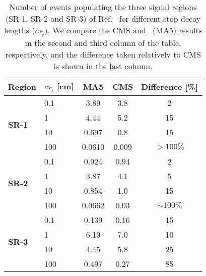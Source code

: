 \begin{table}[t]
\begin{center}
  \begin{tabular}{l || l | c  c | c }
    Region & $c\tau_{\tilde t}$ [cm] & MA5 & CMS& Difference [\%] \\ \hline\hline
    \multirow{4}{*}{\bf SR-1}& 0.1 & 3.89   & 3.8  & 2\\
                             & 1   & 4.44   & 5.2  & 15\\
                             & 10  & 0.697  & 0.8  & 15\\
                             & 100 & 0.0610 & 0.009& $> 100\%$\\ \hline
    \multirow{4}{*}{\bf SR-2}& 0.1 & 0.924  & 0.94 & 2\\
                             & 1   & 3.87   & 4.1  & 5\\
                             & 10  & 0.854  & 1.0  & 15\\
                             & 100 & 0.0662 & 0.03 & $\sim 100\%$\\ \hline
    \multirow{4}{*}{\bf SR-3}& 0.1 & 0.139  & 0.16 & 15\\
                             & 1   & 6.19   & 7.0  & 10\\
                             & 10  & 4.45   & 5.8  & 25\\
                             & 100 & 0.497  & 0.27 & 85\\
  \end{tabular}
  \caption{Number of events populating the three signal regions (SR-1, SR-2 and SR-3) of Ref.~\cite{CMS-PAS-EXO-16-022}
   for different stop decay lengths ($c\tau_{\tilde t}$).
    We compare the CMS and \MA~(MA5) results in the second
    and third column of the table, respectively, and the difference taken relatively to CMS is
    shown in the last column.}
  \label{tab:cms_exo}
\end{center}
\end{table}
\renewcommand{\arraystretch}{1}


